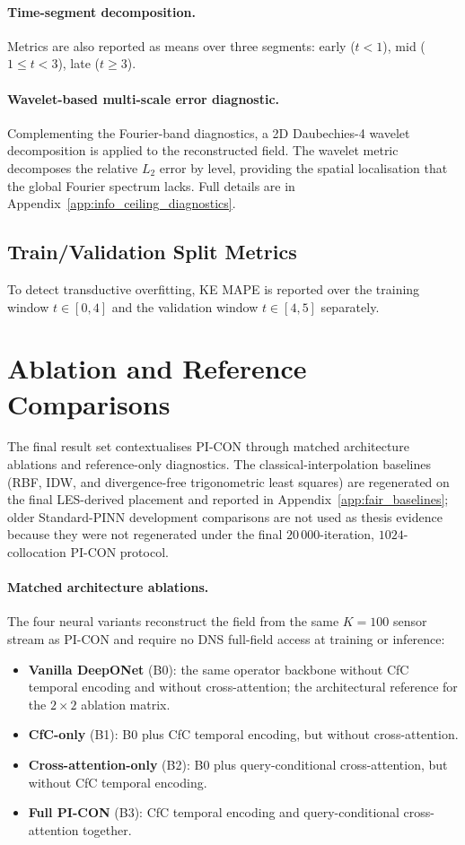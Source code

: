 \paragraph{Time-segment decomposition.}
Metrics are also reported as means over three segments: early ($t<1$), mid ($1\le t<3$), late ($t\ge 3$).

\paragraph{Wavelet-based multi-scale error diagnostic.}
Complementing the Fourier-band diagnostics, a 2D Daubechies-4 wavelet decomposition is applied to the reconstructed field. The wavelet metric decomposes the relative $L_2$ error by level, providing the spatial localisation that the global Fourier spectrum lacks. Full details are in Appendix~\ref{app:info_ceiling_diagnostics}.

\subsection{Train/Validation Split Metrics}
To detect transductive overfitting, KE MAPE is reported over the training window $t\in[0, 4]$ and the validation window $t\in[4, 5]$ separately.

\section{Ablation and Reference Comparisons}
\label{sec:baselines}

The final result set contextualises PI-CON through matched architecture ablations and reference-only diagnostics. The classical-interpolation baselines (RBF, IDW, and divergence-free trigonometric least squares) are regenerated on the final LES-derived placement and reported in Appendix~\ref{app:fair_baselines}; older Standard-PINN development comparisons are not used as thesis evidence because they were not regenerated under the final $20\,000$-iteration, $1024$-collocation PI-CON protocol.

\paragraph{Matched architecture ablations.}
The four neural variants reconstruct the field from the same $K=100$ sensor stream as PI-CON and require no DNS full-field access at training or inference:
\begin{itemize}
    \item \textbf{Vanilla DeepONet} (B0): the same operator backbone without CfC temporal encoding and without cross-attention; the architectural reference for the $2\times2$ ablation matrix.
    \item \textbf{CfC-only} (B1): B0 plus CfC temporal encoding, but without cross-attention.
    \item \textbf{Cross-attention-only} (B2): B0 plus query-conditional cross-attention, but without CfC temporal encoding.
    \item \textbf{Full PI-CON} (B3): CfC temporal encoding and query-conditional cross-attention together.
\end{itemize}

